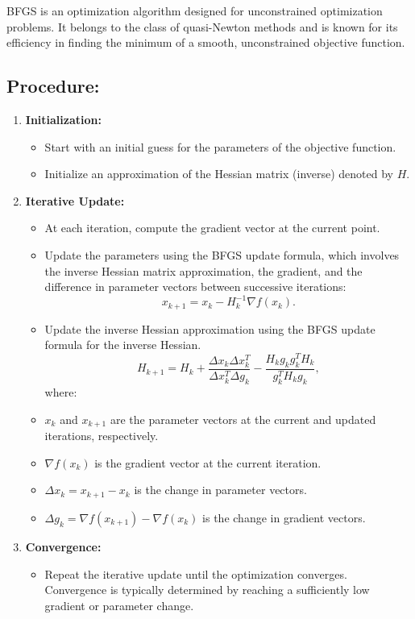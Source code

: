 \documentclass[
  letterpaper,
  DIV=11,
  numbers=noendperiod]{scrreprt}
\providecommand{\tightlist}{%
  \setlength{\itemsep}{0pt}\setlength{\parskip}{0pt}}\usepackage{longtable,booktabs,array}
\begin{document}
BFGS is an optimization algorithm designed for unconstrained
optimization problems. It belongs to the class of quasi-Newton methods
and is known for its efficiency in finding the minimum of a smooth,
unconstrained objective function.

\hypertarget{procedure}{%
\subsection{Procedure:}\label{procedure}}

\begin{enumerate}
\def\labelenumi{\arabic{enumi}.}
\tightlist
\item
  \textbf{Initialization:}

  \begin{itemize}
  \tightlist
  \item
    Start with an initial guess for the parameters of the objective
    function.
  \item
    Initialize an approximation of the Hessian matrix (inverse) denoted
    by \(H\).\\
  \end{itemize}
\item
  \textbf{Iterative Update:}

  \begin{itemize}
  \tightlist
  \item
    At each iteration, compute the gradient vector at the current point.
  \item
    Update the parameters using the BFGS update formula, which involves
    the inverse Hessian matrix approximation, the gradient, and the
    difference in parameter vectors between successive iterations:
    \[x_{k+1} = x_k - H_k^{-1} \nabla f(x_k).\]
  \item
    Update the inverse Hessian approximation using the BFGS update
    formula for the inverse Hessian.
    \[H_{k+1} = H_k + \frac{\Delta x_k \Delta x_k^T}{\Delta x_k^T \Delta g_k} - \frac{H_k g_k g_k^T H_k}{g_k^T H_k g_k},\]
    where:
  \item
    \(x_k\) and \(x_{k+1}\) are the parameter vectors at the current and
    updated iterations, respectively.
  \item
    \(\nabla f(x_k)\) is the gradient vector at the current iteration.
  \item
    \(\Delta x_k = x_{k+1} - x_k\) is the change in parameter vectors.
  \item
    \(\Delta g_k = \nabla f(x_{k+1}) - \nabla f(x_k)\) is the change in
    gradient vectors.
  \end{itemize}
\item
  \textbf{Convergence:}

  \begin{itemize}
  \tightlist
  \item
    Repeat the iterative update until the optimization converges.
    Convergence is typically determined by reaching a sufficiently low
    gradient or parameter change.
  \end{itemize}
\end{enumerate}
\end{document}

